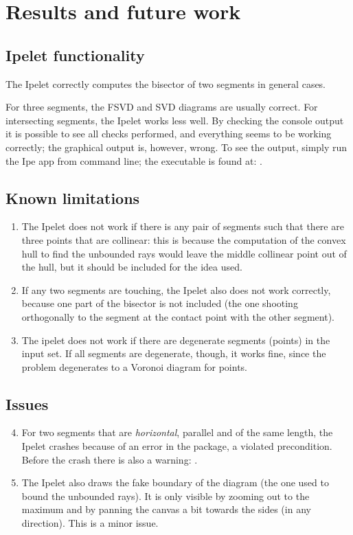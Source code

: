 \documentclass[11pt,a4paper,english]{article}
\begin{document}
	\section{Results and future work}
	
	\subsection{Ipelet functionality}
	The Ipelet correctly computes the bisector of two segments in general cases.\par
	For three segments, the FSVD and SVD diagrams are usually correct. For intersecting segments, the Ipelet works less well. By checking the console output it is possible to see all checks performed, and everything seems to be working correctly; the graphical output is, however, wrong.\ppar
	To see the output, simply run the Ipe app from command line; the executable is found at: .
	
	\subsection{Known limitations}
	\begin{enumerate}
	\item The Ipelet does not work if there is any pair of segments such that there are three points that are collinear: this is because the computation of the convex hull to find the unbounded rays would leave the middle collinear point out of the hull, but it should be included for the idea used.
	\item If any two segments are touching, the Ipelet also does not work correctly, because one part of the bisector is not included (the one shooting orthogonally to the segment at the contact point with the other segment).
	\item The ipelet does not work if there are degenerate segments (points) in the input set. If all segments are degenerate, though, it works fine, since the problem degenerates to a Voronoi diagram for points.
	\end{enumerate}
	
	\subsection{Issues}
	\begin{enumerate}
	\setcounter{enumi}{3}
	\item For two segments that are \emph{horizontal}, parallel and of the same length, the Ipelet crashes because of an error in the  package, a violated precondition. Before the crash there is also a warning: .
	\item The Ipelet also draws the fake boundary of the diagram (the one used to bound the unbounded rays). It is only visible by zooming out to the maximum and by panning the canvas a bit towards the sides (in any direction). This is a minor issue.
	\end{enumerate}
	
\end{document}
